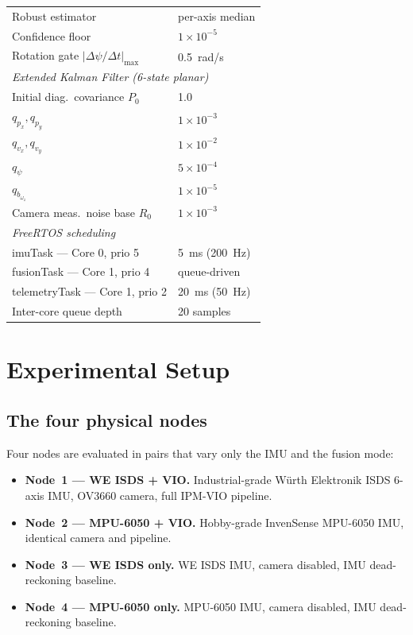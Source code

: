 \documentclass[conference]{IEEEtran}
\begin{document}
\begin{table}[!t]
\begin{tabular}{l l}
\quad Robust estimator                           & per-axis median \\
\quad Confidence floor                           & $1\!\times\!10^{-5}$ \\
\quad Rotation gate $|\Delta\psi/\Delta t|_{\max}$ & 0.5~rad/s \\
\midrule
\multicolumn{2}{l}{\textit{Extended Kalman Filter (6-state planar)}} \\
\quad Initial diag.\ covariance $P_0$            & 1.0 \\
\quad $q_{p_x}, q_{p_y}$                         & $1\!\times\!10^{-3}$ \\
\quad $q_{v_x}, q_{v_y}$                         & $1\!\times\!10^{-2}$ \\
\quad $q_{\psi}$                                 & $5\!\times\!10^{-4}$ \\
\quad $q_{b_{\omega_z}}$                         & $1\!\times\!10^{-5}$ \\
\quad Camera meas.\ noise base $R_0$             & $1\!\times\!10^{-3}$ \\
\midrule
\multicolumn{2}{l}{\textit{FreeRTOS scheduling}} \\
\quad imuTask --- Core 0, prio 5                 & 5~ms (200~Hz) \\
\quad fusionTask --- Core 1, prio 4              & queue-driven \\
\quad telemetryTask --- Core 1, prio 2           & 20~ms (50~Hz) \\
\quad Inter-core queue depth                     & 20 samples \\
\bottomrule
\end{tabular}
\end{table}

\section{Experimental Setup}
\label{sec:exp}

\subsection{The four physical nodes}
\label{sec:nodes}
Four nodes are evaluated in pairs that vary only the IMU and the
fusion mode:

\begin{itemize}
\item \textbf{Node~1 --- WE ISDS + VIO.}  Industrial-grade
W\"urth Elektronik ISDS 6-axis IMU, OV3660 camera, full IPM-VIO
pipeline.
\item \textbf{Node~2 --- MPU-6050 + VIO.}  Hobby-grade InvenSense
MPU-6050 IMU, identical camera and pipeline.
\item \textbf{Node~3 --- WE ISDS only.}  WE ISDS IMU,
camera disabled, IMU dead-reckoning baseline.
\item \textbf{Node~4 --- MPU-6050 only.}  MPU-6050 IMU, camera
disabled, IMU dead-reckoning baseline.
\end{itemize}
\end{document}
